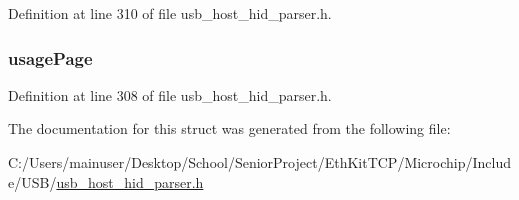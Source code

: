 Definition at line 310 of file usb\+\_\+host\+\_\+hid\+\_\+parser.\+h.

\hypertarget{struct___h_i_d___u_s_a_g_e_i_t_e_m_aa44ef18c8cbb507831398f1e85c62d0b}{}
\subsubsection[{usage\+Page}]{ usage\+Page}\label{struct___h_i_d___u_s_a_g_e_i_t_e_m_aa44ef18c8cbb507831398f1e85c62d0b}


Definition at line 308 of file usb\+\_\+host\+\_\+hid\+\_\+parser.\+h.



The documentation for this struct was generated from the following file\+:\begin{DoxyCompactItemize}
\item 
C\+:/\+Users/mainuser/\+Desktop/\+School/\+Senior\+Project/\+Eth\+Kit\+T\+C\+P/\+Microchip/\+Include/\+U\+S\+B/\hyperlink{usb__host__hid__parser_8h}{usb\+\_\+host\+\_\+hid\+\_\+parser.\+h}\end{DoxyCompactItemize}
